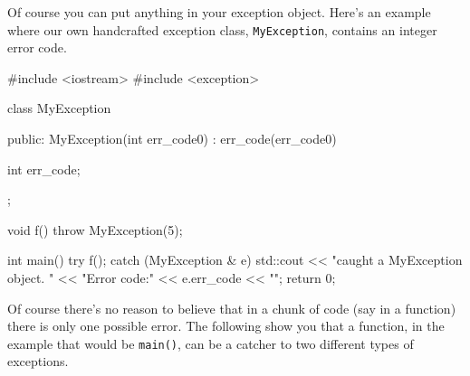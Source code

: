 \newpage{}

Of course you can put anything in your exception object.
Here's an example where our own handcrafted exception
class, \texttt{MyException}, contains an integer error code.

\begin{console}
#include <iostream>
#include <exception>

class MyException
{
public:
        MyException(int err_code0)
        : err_code(err_code0)
        {}
        
        int err_code;
};

void f()
{    
     throw MyException(5);
}

int main()
{   
    try
    {   
        f();
    }
    catch (MyException & e)
    {     
          std::cout << "caught a MyException object. "
                    << "Error code:" << e.err_code
                    << "\n";
    }
    return 0;
}
\end{console}

\newpage{}

Of course there's no reason to believe that in a chunk
of code (say in a function) there is only one possible error. The
following show you that a function, in the example that would be
\texttt{main()}, can be a catcher to two different types of exceptions.



